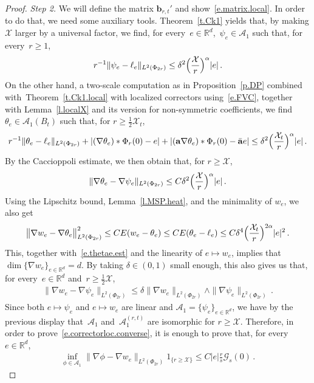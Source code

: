 \documentclass[11pt]{article} %
\numberwithin{equation}{section}
\theoremstyle{definition}
\newcommand*{\R}{\ensuremath{\mathbb{R}}}
\renewcommand{\b}{\ensuremath{\mathbf{b}}}
\renewcommand{\a}{\mathbf{a}}
\newcommand{\ahom}{\bar{\a}}
\newcommand{\X}{\mathcal{X}}
\newcommand{\indc}{1}
\newcommand{\A}{\mathcal{A}}
\begin{document}
\begin{proof}
\smallskip

\emph{Step 2.} We will define the matrix $\b_{r,t}'$ and show~\eqref{e.matrix.local}. In order to do that, we need some auxiliary tools. Theorem~\ref{t.Ck1} yields that, by making $\X$ larger by a universal factor, 
we find, for every~$e \in \R^d$,~$\psi_e \in \A_1$ such that, for every~$r\geq 1$, 
\begin{align*}  
r^{-1} \| \psi_e - \ell_e \|_{L^2(\Phi_{2r})} \leq \delta^2 \Bigl( \frac{\X}{r} \Bigr)^\alpha |e| \,.
\end{align*}
On the other hand, a two-scale computation as in Proposition~\ref{p.DP} combined with~Theorem~\ref{t.Ck1.local} with localized correctors using~\eqref{e.FVC}, together with Lemma~\ref{l.localX} and its version for non-symmetric coefficients, we find~$\theta_e \in \A_1(B_t)$ such that, for $r\geq \frac12 \X_t$, 
\begin{align} \label{e.thetae.est}
r^{-1} \| \theta_e - \ell_e \|_{L^2(\Phi_{2r})} + |(\nabla \theta_e)\ast \Phi_r(0) - e| + |(\a \nabla \theta_e)\ast \Phi_r(0) - \ahom e|  \leq \delta^2 \Bigl( \frac{\X_t}{r} \Bigr)^\alpha |e| \,.
\end{align}
By the Caccioppoli estimate, we then obtain that, for $r \geq \X$, 
\begin{align*}  
\| \nabla \theta_e - \nabla \psi_e \|_{L^2(\Phi_{2r})} \leq C  \delta^2 \Bigl( \frac{\X}{r} \Bigr)^\alpha |e| \,. 
\end{align*}
Using the Lipschitz bound, Lemma~\ref{l.MSP.heat}, and the minimality of $w_e$, we also get
\begin{align}  \label{e.we.vs.thetae}
\big\| \nabla w_e - \nabla \theta_e \big\|_{L^2(\Phi_{2r})}^2  \leq C E(w_e - \theta_e ) \leq 
C E(\theta_e - \ell_e)  \leq C \delta^4  \Bigl( \frac{\X_t}{r} \Bigr)^{2\alpha} |e|^2  \,.
\end{align}
This, together with~\eqref{e.thetae.est} and the linearity of $e \mapsto w_e$, implies that $\dim\{\nabla w_e \}_{e \in \R^d} = d$. 
By taking $\delta \in(0,1)$ small enough, this also gives us that, for every~$e \in \R^d$ and~$r \geq \frac12 \X$,
\begin{align*}  
\| \nabla w_e - \nabla \psi_e \|_{L^2(\Phi_{2r})} 
\leq 
\delta \| \nabla w_e \|_{L^2(\Phi_{2r})} \wedge \| \nabla \psi_e \|_{L^2(\Phi_{2r})}  \,.
\end{align*}
Since both $e \mapsto \psi_e$ and $e \mapsto w_e$ are linear and $\A_1 = \{ \psi_e \}_{e \in \R^d}$, we have by the previous display that~$\A_1$ and~$\A_1^{(r,t)}$ are isomorphic for $r\geq \X$. Therefore, in order to prove~\eqref{e.correctorloc.converse}, it is enough to prove that, for every $e \in \R^d$, 
\begin{align*}  
\inf_{\phi \in \A_1 }
\big\| \nabla \phi - \nabla w_e \big\|_{L^2(\Phi_{2r})}
\indc_{\{ r \geq \X \}} %
\leq 
C |e| \frac{r}{s} \mathcal{G}_{s}(0) 
\,.
\end{align*}


\end{proof}
\end{document}
